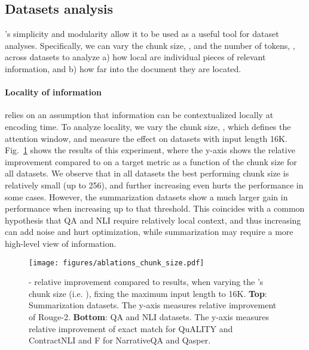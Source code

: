 \subsection{Datasets analysis}
\sled{}'s simplicity and modularity allow it to be used as a useful tool for dataset analyses. Specifically, we can vary the chunk size, , and the number of tokens, , across datasets to analyze a) how local are individual pieces of relevant information, and b) 
how far into the document they are located.

\label{subsec:properties}
\paragraph{Locality of information}
\sled{} relies on an assumption that information can be contextualized locally at encoding time. To analyze locality, we vary the chunk size, , which defines the attention window, and measure
the effect on \SCROLLS{} datasets with input length 16K. 
Fig.~\ref{fig:ab-chunk} shows the results of this experiment, where the y-axis shows the relative improvement compared to \bartbase{} on a target metric as a function of the chunk size  for all datasets.
We observe that in all datasets the best performing chunk size is relatively small (up to 256), and further increasing  even hurts the performance in some cases. However, the summarization datasets show a much larger gain in performance when increasing  up to that threshold.
This coincides with a common hypothesis that QA and NLI require relatively local context, and thus increasing  can add noise and hurt optimization, while summarization may require a more high-level view of information.



\begin{figure}[t]
\begin{center}


\centerline{
\texttt{[image: figures/ablations\_chunk\_size.pdf]}
}
\setlength{\belowcaptionskip}{-20pt}
\caption{\bartbase{}-\sled{} relative improvement compared to \bartbase{} results, when varying the \sled{}'s chunk size (i.e. ), fixing the maximum input length to 16K. \textbf{Top}: Summarization datasets. The y-axis measures relative improvement of Rouge-2. \textbf{Bottom}: QA and NLI datasets. The y-axis measures relative improvement of exact match for QuALITY and ContractNLI and F for NarrativeQA and Qasper.
}
 
\label{fig:ab-chunk}
\end{center}
\end{figure} 
